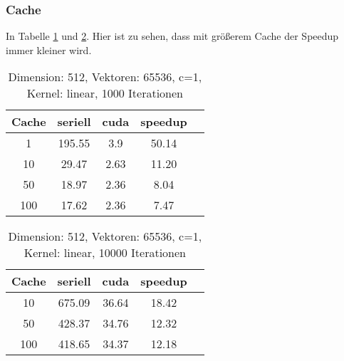 \documentclass[ngerman]{scrartcl}
\begin{document}
\subsubsection{Cache}
In Tabelle \ref{tbl:cache} und \ref{tbl:cache2}. Hier ist zu sehen, dass mit größerem Cache der Speedup immer kleiner wird.









\begin{table}
\begin{center}
\begin{tabular}{|c|c|c|c|c|}
\hline
Cache & seriell & cuda & speedup \\
\hline
1 &  195.55 & 3.9 & 50.14 \\
10 &  29.47 & 2.63 & 11.20 \\
50 &  18.97 & 2.36 & 8.04 \\
100 &  17.62 & 2.36 & 7.47 \\
\hline
\end{tabular}
\end{center}
\caption{ Dimension: 512, Vektoren: 65536, c=1, Kernel: linear, 1000 Iterationen}
\label{tbl:cache}
\end{table}


\begin{table}
\begin{center}
\begin{tabular}{|c|c|c|c|c|}
\hline
Cache & seriell & cuda & speedup \\
\hline
10 &  675.09 & 36.64 & 18.42 \\
50 &  428.37 & 34.76 & 12.32 \\
100 &  418.65 & 34.37 & 12.18 \\
\hline
\end{tabular}
\end{center}
\caption{ Dimension: 512, Vektoren: 65536, c=1, Kernel: linear, 10000 Iterationen}
\label{tbl:cache2}
\end{table}
\end{document}
